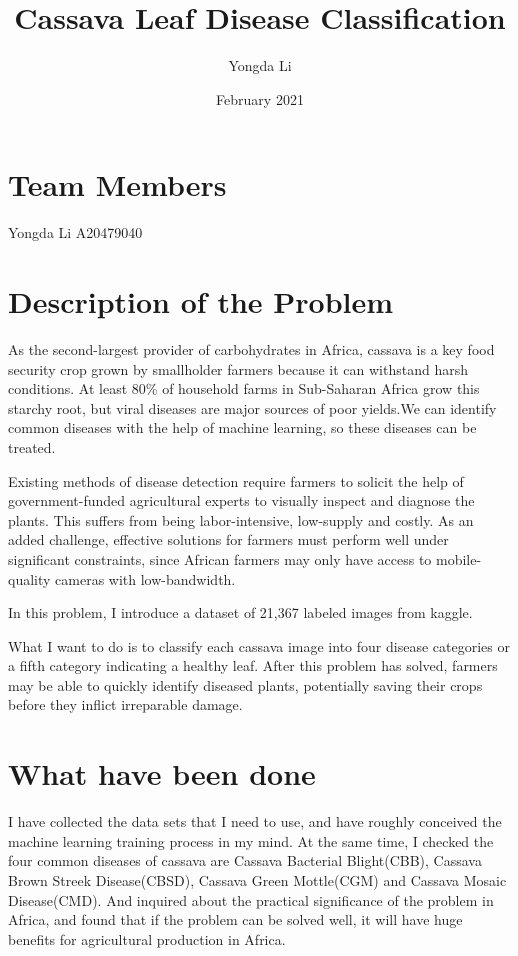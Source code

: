 \documentclass{article}
\title{Cassava Leaf Disease Classification}
\author{Yongda Li}
\date{February 2021}
\begin{document}
\maketitle
\tableofcontents


\section{Team Members}
Yongda Li A20479040

\section{Description of the Problem}

As the second-largest provider of carbohydrates in Africa, cassava is a key food security crop grown by smallholder farmers because it can withstand harsh conditions. At least 80\% of household farms in Sub-Saharan Africa grow this starchy root, but viral diseases are major sources of poor yields.We can identify common diseases with the help of machine learning, so these diseases can be treated.

Existing methods of disease detection require farmers to solicit the help of government-funded agricultural experts to visually inspect and diagnose the plants. This suffers from being labor-intensive, low-supply and costly. As an added challenge, effective solutions for farmers must perform well under significant constraints, since African farmers may only have access to mobile-quality cameras with low-bandwidth.

In this problem, I introduce a dataset of 21,367 labeled images from kaggle.

What I want to do is to classify each cassava image into four disease categories or a fifth category indicating a healthy leaf. After this problem has solved, farmers may be able to quickly identify diseased plants, potentially saving their crops before they inflict irreparable damage.

\section{What have been done}
I have collected the data sets that I need to use, and have roughly conceived the machine learning training process in my mind. At the same time, I checked the four common diseases of cassava are Cassava Bacterial Blight(CBB), Cassava Brown Streek Disease(CBSD), Cassava Green Mottle(CGM) and Cassava Mosaic Disease(CMD). And inquired about the practical significance of the problem in Africa, and found that if the problem can be solved well, it will have huge benefits for agricultural production in Africa.
\end{document}
